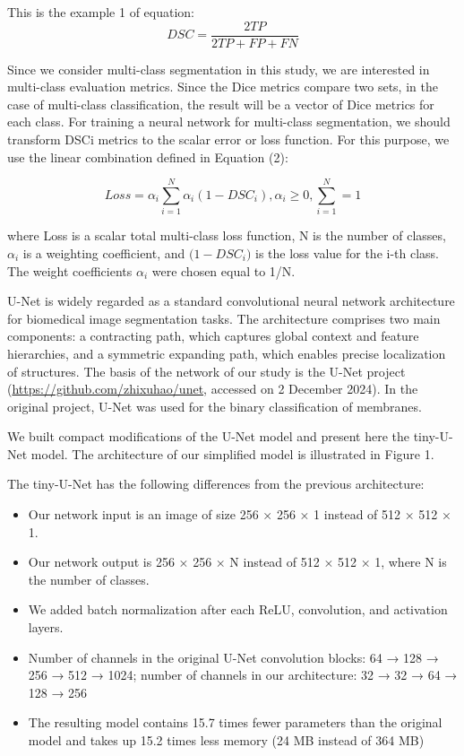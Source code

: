 \documentclass[journal,article,submit,pdftex,moreauthors]{Definitions/mdpi}
\begin{document}
This is the example 1 of equation:
\begin{equation}
DSC = \frac{2TP}{2TP+FP+FN}
\end{equation}

Since we consider multi-class segmentation in this study, we are interested in multi-class evaluation metrics. Since the Dice metrics compare two sets, in the case of multi-class classification, the result will be a vector of Dice metrics for each class. For training a neural network for multi-class segmentation, we should transform DSCi metrics to the scalar error or loss function. For this purpose, we use the linear combination defined in Equation (2):

\begin{equation}
Loss = \alpha _i\sum_{i = 1}^{N}\alpha _i (1-DSC_i),\alpha _i \geq 0,\sum_{i = 1}^{N}=1
\end{equation}

where Loss is a scalar total multi-class loss function, N is the number of classes, $\alpha _i$ is a weighting coefficient, and $\mathcal(1 - DSC_i)$ is the loss value for the i-th class. The weight coefficients $\alpha _i$ were chosen equal to 1/N.

\vspace{10pt}

U-Net is widely regarded as a standard convolutional neural network architecture for biomedical image segmentation tasks. The architecture comprises two main components: a contracting path, which captures global context and feature hierarchies, and a symmetric expanding path, which enables precise localization of structures. The basis of the network of our study is the U-Net project (\href{https://github.com/zhixuhao/unet}{https://github.com/zhixuhao/unet}, accessed on 2 December 2024). In the original project, U-Net was used for the binary classification of membranes.

We built compact modifications of the U-Net model and present here the tiny-U-Net model. The architecture of our simplified model is illustrated in Figure 1.

The tiny-U-Net has the following differences from the previous architecture:
\begin{itemize}
	\item {Our network input is an image of size 256 × 256 × 1 instead of 512 × 512 × 1.}
	\item {Our network output is 256 × 256 × N instead of 512 × 512 × 1, where N is the number of classes.}
	\item {We added batch normalization after each ReLU, convolution, and activation layers.}
	\item {Number of channels in the original U-Net convolution blocks: 64 → 128 → 256 → 512 → 1024; number of channels in our architecture: 32 → 32 → 64 → 128 → 256}
	\item {The resulting model contains 15.7 times fewer parameters than the original model and takes up 15.2 times less memory (24 MB instead of 364 MB)}
\end{itemize}
\end{document}
